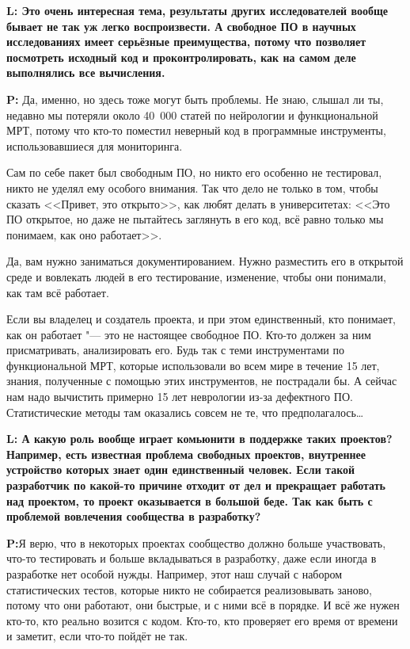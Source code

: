 \documentclass[10pt, a5paper]{article}
\begin{document}
\begin{Parallel}[p]{}{}
{{\noindent \bf L: Это очень интересная тема, результаты других исследователей вообще бывает не так уж легко воспроизвести.
А свободное ПО в научных исследованиях имеет серьёзные преимущества, потому что позволяет посмотреть исходный код и проконтролировать, как на самом деле выполнялись все вычисления.}

{\noindent \bf P:} Да, именно, но здесь тоже могут быть проблемы. Не знаю, слышал ли ты, недавно мы потеряли около 40~000 статей по нейрологии и функциональной МРТ, потому что кто-то поместил неверный код в программные инструменты, использовавшиеся для мониторинга. 

Сам по себе пакет был свободным ПО, но никто его особенно не тестировал, никто не уделял ему особого внимания. Так что дело не только в том, чтобы сказать <<Привет, это открыто>>, как любят делать в университетах: <<Это ПО открытое, но даже не пытайтесь заглянуть в его код, всё равно только мы понимаем, как оно работает>>. 

Да, вам нужно заниматься документированием. Нужно разместить его в открытой среде и вовлекать людей в его тестирование, изменение, чтобы они понимали, как там всё работает.

Если вы владелец и создатель проекта, и при этом единственный, кто понимает, как он работает "--- это не настоящее свободное ПО. Кто-то должен за ним присматривать, анализировать его. Будь так с теми инструментами по функциональной МРТ, которые использовали во всем мире в течение 15 лет, знания, полученные с помощью этих инструментов, не пострадали бы. А сейчас нам надо вычистить примерно 15 лет неврологии из-за дефектного ПО. Статистические методы там оказались совсем не те, что предполагалось\ldots

{\noindent \bf L: А какую роль вообще играет комьюнити в поддержке таких проектов? Например, есть известная проблема свободных проектов, внутреннее устройство которых знает один единственный человек. Если такой разработчик по какой-то причине отходит от дел и прекращает работать над проектом, то проект оказывается в большой беде. Так как быть с проблемой вовлечения сообщества в разработку?}

{\noindent \bf P:}Я верю, что в некоторых проектах сообщество должно больше участвовать, что-то тестировать и больше вкладываться в разработку, даже если иногда в разработке нет особой нужды. Например, этот наш случай с набором статистических тестов, которые никто не собирается реализовывать заново, потому что они работают, они быстрые, и с ними всё в порядке. И всё же нужен кто-то, кто реально возится с кодом. Кто-то, кто проверяет его время от времени и заметит, если что-то пойдёт не так. 

}
\end{Parallel}
\end{document}
